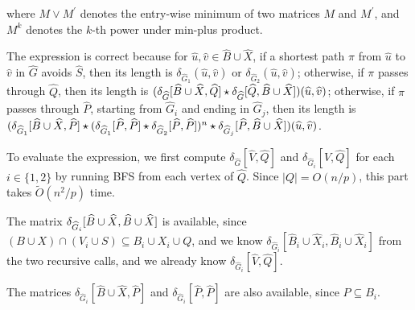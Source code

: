 where $M\vee M^{\prime}$ denotes the entry-wise minimum of two matrices $M$ and $M^{\prime}$, and $M^{k}$ denotes the $k$-th power under min-plus product.
\par
\par
The expression is correct because for $\widehat{u},\widehat{v}\in\widehat{B}\cup\widehat{X}$, if a shortest path $\pi$ from $\widehat{u}$ to $\widehat{v}$ in ${\widehat{G}}$ avoids $\widehat{S}$, then its length is $\delta_{{\widehat{G}}_{1}}(\widehat{u},\widehat{v})$ or $\delta_{{\widehat{G}}_{2}}(\widehat{u},\widehat{v})$; otherwise, if $\pi$ passes through $\widehat{Q}$, then its length is $(\delta_{\widehat{G}}[\widehat{B}\cup\widehat{X},\widehat{Q}]\star\delta_{%
\widehat{G}}[\widehat{Q},\widehat{B}\cup\widehat{X}])(\widehat{u},\widehat{v})$; otherwise, if $\pi$ passes through $\widehat{P}$, starting from ${\widehat{G}}_{i}$ and ending in ${\widehat{G}}_{j}$, then its length is $(\delta_{{\widehat{G}}_{1}}[\widehat{B}\cup\widehat{X},\widehat{P}]\star(%
\delta_{{\widehat{G}}_{1}}[\widehat{P},\widehat{P}]\star\delta_{{\widehat{G}}_%
{2}}[\widehat{P},\widehat{P}])^{n}\star\delta_{{\widehat{G}}_{j}}[\widehat{P},%
\widehat{B}\cup\widehat{X}])(\widehat{u},\widehat{v})$.
\par
\par
To evaluate the expression, we first compute $\delta_{{\widehat{G}}}[\widehat{V},\widehat{Q}]$ and $\delta_{{\widehat{G}}_{i}}[\widehat{V},\widehat{Q}]$ for each $i\in\{1,2\}$ by running BFS from each vertex of $\widehat{Q}$. Since ${\left|Q\right|}=O(n/p)$, this part takes $\widetilde{O}(n^{2}/p)$ time.
\par
\par
The matrix $\delta_{{\widehat{G}}_{i}}[\widehat{B}\cup\widehat{X},\widehat{B}\cup\widehat{%
X}]$ is available, since $(B\cup X)\cap(V_{i}\cup S)\subseteq B_{i}\cup X_{i}\cup Q$, and we know $\delta_{{\widehat{G}}_{i}}[\widehat{B}_{i}\cup\widehat{X}_{i},\widehat{B}_{i}%
\cup\widehat{X}_{i}]$ from the two recursive calls, and we already know $\delta_{{\widehat{G}}_{i}}[\widehat{V},\widehat{Q}]$.
\par
\par
The matrices $\delta_{{\widehat{G}}_{i}}[\widehat{B}\cup\widehat{X},\widehat{P}]$ and $\delta_{{\widehat{G}}_{i}}[\widehat{P},\widehat{P}]$ are also available, since $P\subseteq B_{i}$.
